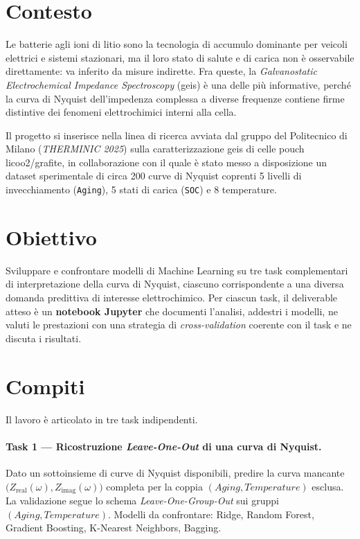 
\section*{Contesto}

Le batterie agli ioni di litio sono la tecnologia di accumulo dominante
per veicoli elettrici e sistemi stazionari, ma il loro stato di salute
e di carica non è osservabile direttamente: va inferito da misure
indirette. Fra queste, la \emph{Galvanostatic Electrochemical Impedance
Spectroscopy} (\acrshort{geis}) è una delle più informative, perché la
curva di Nyquist dell'impedenza complessa a diverse frequenze contiene
firme distintive dei fenomeni elettrochimici interni alla cella.

Il progetto si inserisce nella linea di ricerca avviata dal gruppo del
Politecnico di Milano (\textit{THERMINIC 2025}) sulla
caratterizzazione \acrshort{geis} di celle pouch
\acrshort{licoo2}/grafite, in collaborazione con il quale è stato messo
a disposizione un dataset sperimentale di circa 200 curve di Nyquist
coprenti 5 livelli di invecchiamento (\texttt{Aging}), 5 stati di carica
(\texttt{SOC}) e 8 temperature.

\section*{Obiettivo}

Sviluppare e confrontare modelli di Machine Learning su tre task
complementari di interpretazione della curva di Nyquist, ciascuno
corrispondente a una diversa domanda predittiva di interesse
elettrochimico. Per ciascun task, il deliverable atteso è un
\textbf{notebook Jupyter} che documenti l'analisi, addestri i modelli,
ne valuti le prestazioni con una strategia di \emph{cross-validation}
coerente con il task e ne discuta i risultati.

\section*{Compiti}

Il lavoro è articolato in tre task indipendenti.

\paragraph{Task 1 --- Ricostruzione \emph{Leave-One-Out} di una curva
di Nyquist.}
Dato un sottoinsieme di curve di Nyquist disponibili, predire la curva
mancante \(\bigl(Z_{\text{real}}(\omega), Z_{\text{imag}}(\omega)\bigr)\)
completa per la coppia \((\textit{Aging}, \textit{Temperature})\)
esclusa. La validazione segue lo schema \emph{Leave-One-Group-Out} sui
gruppi \((\textit{Aging}, \textit{Temperature})\). Modelli da
confrontare: Ridge, Random Forest, Gradient Boosting, K-Nearest
Neighbors, Bagging.

